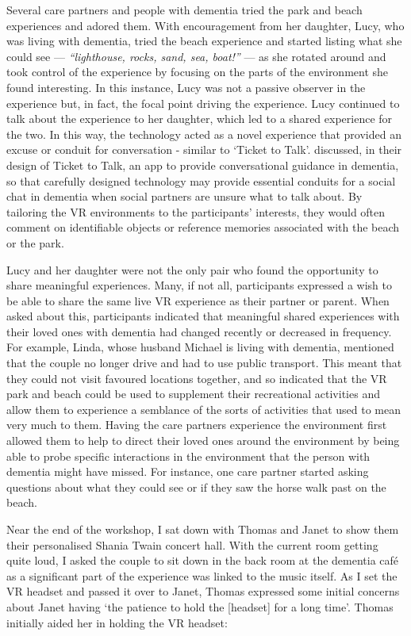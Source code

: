Several care partners and people with dementia tried the park and beach experiences and adored them. With encouragement from her daughter, Lucy, who was living with dementia, tried the beach experience and started listing what she could see — \textit{``lighthouse, rocks, sand, sea, boat!''} — as she rotated around and took control of the experience by focusing on the parts of the environment she found interesting. In this instance, Lucy was not a passive observer in the experience but, in fact, the focal point driving the experience. Lucy continued to talk about the experience to her daughter, which led to a shared experience for the two. In this way, the technology acted as a novel experience that provided an excuse or conduit for conversation - similar to `Ticket to Talk'. \cite{welsh_ticket_2018} discussed, in their design of Ticket to Talk, an app to provide conversational guidance in dementia, so that carefully designed technology may provide essential conduits for a social chat in dementia when social partners are unsure what to talk about. By tailoring the VR environments to the participants' interests, they would often comment on identifiable objects or reference memories associated with the beach or the park.

Lucy and her daughter were not the only pair who found the opportunity to share meaningful experiences. Many, if not all, participants expressed a wish to be able to share the same live VR experience as their partner or parent. When asked about this, participants indicated that meaningful shared experiences with their loved ones with dementia had changed recently or decreased in frequency. For example, Linda, whose husband Michael is living with dementia, mentioned that the couple no longer drive and had to use public transport. This meant that they could not visit favoured locations together, and so indicated that the VR park and beach could be used to supplement their recreational activities and allow them to experience a semblance of the sorts of activities that used to mean very much to them. Having the care partners experience the environment first allowed them to help to direct their loved ones around the environment by being able to probe specific interactions in the environment that the person with dementia might have missed. For instance, one care partner started asking questions about what they could see or if they saw the horse walk past on the beach. 

Near the end of the workshop, I sat down with Thomas and Janet to show them their personalised Shania Twain concert hall. With the current room getting quite loud, I asked the couple to sit down in the back room at the dementia café as a significant part of the experience was linked to the music itself. As I set the VR headset and passed it over to Janet, Thomas expressed some initial concerns about Janet having ‘the patience to hold the [headset] for a long time’. Thomas initially aided her in holding the VR headset:

